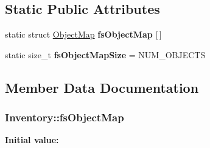 \subsection*{\-Static \-Public \-Attributes}
\begin{DoxyCompactItemize}
\item 
static struct \hyperlink{structInventory_1_1ObjectMap}{\-Object\-Map} {\bfseries fs\-Object\-Map} \mbox{[}$\,$\mbox{]}
\item 
\hypertarget{classInventory_a26d8eba242fc0182016aed67811ddb9d}{static size\-\_\-t {\bfseries fs\-Object\-Map\-Size} = \-N\-U\-M\-\_\-\-O\-B\-J\-E\-C\-T\-S}\label{classInventory_a26d8eba242fc0182016aed67811ddb9d}

\end{DoxyCompactItemize}


\subsection{\-Member \-Data \-Documentation}
\hypertarget{classInventory_a128ae8d2e2b6e1a88f257891917c1cbf}{
\subsubsection[{fs\-Object\-Map}]{ \-Inventory\-::fs\-Object\-Map}}\label{classInventory_a128ae8d2e2b6e1a88f257891917c1cbf}
{\bfseries \-Initial value\-:}
